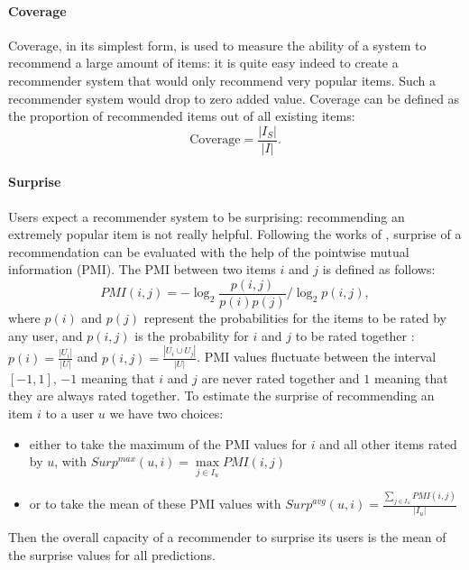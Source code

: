 \documentclass{llncs}
\begin{document}
\paragraph{Coverage\\}
Coverage, in its simplest form, is used to measure the ability of a system to
recommend a large amount of items: it is quite easy indeed to create a
recommender system that would only recommend very popular items. Such a
recommender system would drop to zero added value. Coverage can be defined as the
proportion of recommended items out of all existing items:
$$\text{Coverage} = \frac{|I_{S}|}{|I|}.$$



\paragraph{Surprise\\}
Users expect a recommender system to be surprising: recommending an extremely
popular item is not really helpful. Following the works of \cite{KamBriRecSys2014}, surprise of a recommendation can be evaluated with the help of the pointwise mutual
information (PMI). The PMI between two items $i$ and $j$ is defined as follows:
$$PMI(i, j) = -\log_2 \frac{p(i, j)}{p(i)p(j)} / \log_2 p(i, j),$$
where $p(i)$ and $p(j)$  represent the probabilities for the items to be rated
by any user, and $p(i, j)$ is the probability for $i$ and $j$ to be rated
together : $p(i) = \tfrac{|U_i|}{|U|}$ and $p(i, j) = \tfrac{|U_i \cup
U_j|}{|U|}$. PMI values fluctuate between the interval $[-1, 1]$, $-1$ meaning
that $i$ and $j$ are never rated together and $1$ meaning that they are always
rated together. To estimate the surprise of recommending an item $i$ to a user
$u$ we have two choices: 
\begin{itemize}
\item either to take the maximum of the PMI values for $i$ and all
other items rated by $u$, with $Surp^{max}(u, i) = \max\limits_{j\in I_u} PMI(i, j)$
\item
 or to take the mean of these PMI values with $Surp^{avg}(u, i) =
\frac{\sum_{j \in I_u} PMI(i, j)}{|I_u|}$
\end{itemize}
Then the overall capacity of a recommender to surprise its users is the mean of the
surprise values for all predictions.
\end{document}
